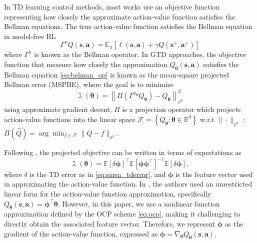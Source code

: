 \documentclass[letterpaper, 10pt, conference]{ieeeconf}
\begin{document}
In TD learning control methods, most works use an objective function representing how closely the approximate action-value function satisfies the Bellman equations.
The true action-value function satisfies the Bellman equation in model-free RL
	\begin{equation}\label{eq:belman_op}
		\Gamma^\pi Q(\mathbf{s},\mathbf{a}) = \mathbb{E}_{\pi}\left[ \ell(\mathbf{s},\mathbf{a}) +\gamma  Q(\mathbf{s}^+,  \mathbf{a}^+)\right]
	\end{equation}
where $\Gamma^\pi$ is known as the Bellman operator. 
In GTD approaches, the objective function that measure how closely the approximation $Q_{\boldsymbol{\theta}}(\mathbf{s}, \mathbf{a})$ satisfies the Bellman equation \eqref{eq:belman_op} is known as the mean-square projected Bellman error (MSPBE), where the goal is to minimize
	\begin{equation}
		\gimel(\boldsymbol{\theta}) = \left\|\Pi(\Gamma^{\pi_{\boldsymbol{\theta}}} Q_{\boldsymbol{\theta}}) - Q_{\boldsymbol{\theta}}\right\|_{\rho^{\pi}}^2
	\end{equation}
using approximate gradient decent, $\Pi$ is a projection operator which projects action-value functions into the linear space $\mathcal{F} = \left\{Q_{\boldsymbol{\theta}}:\boldsymbol{\theta} \in \mathbb{R}^d\right\}$ w.r.t $\|\cdot\|_{\rho^{\pi}}$ : $\Pi(\hat{Q}) = \arg\min_{f \in \mathcal{F}}\|\hat{Q}-f\|_{\rho^{\pi}}$.

Following \cite{maei2010toward}, the projected objective can be written in terms of expectations as 
\begin{equation}
	\gimel (\boldsymbol{\theta}) = \mathbb{E}[\delta\boldsymbol{\phi}]^{\top} \mathbb{E}\left[\boldsymbol{\phi}\boldsymbol{\phi}^{\top}\right]^{-1} \mathbb{E}[\delta\boldsymbol{\phi}],
\end{equation}
where $\delta$ is the TD error as in \eqref{eq:sarsa_tderror}, and $\boldsymbol{\phi}$ is the feature vector used in approximating the action-value function. 
In \cite{maei2010toward}, the authors used  an unrestricted linear form for the action-value function approximation, specifically  $Q_{\boldsymbol{\theta}}(\mathbf{s}, \mathbf{a}) = \boldsymbol{\phi}^{\top} \boldsymbol{\theta}$.
However, in this paper, we use a nonlinear function approximation defined by the OCP scheme \eqref{eq:ocp}, making it challenging to directly obtain the associated feature vector. 
Therefore, we represent $\boldsymbol{\phi}$ as the gradient of the action-value function, expressed as $\boldsymbol{\phi} = \nabla_{\boldsymbol{\theta}}Q_{\boldsymbol{\theta}}(\mathbf{s}, \mathbf{a})$.
\end{document}
